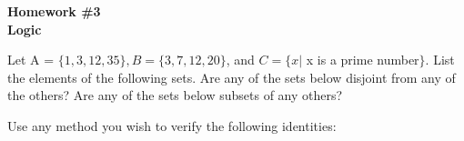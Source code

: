 \documentclass[addpoints,12pt]{exam}
\begin{document}
\begin{center}
    \textbf{\Large Homework \#3} \\
    \vspace{0.1in}
    \textbf{\large Logic}
\end{center}

\vspace{0.3in}

\begin{questions}
\question Let A = $\{1, 3, 12, 35\}, B = \{3, 7, 12, 20\}$, and $C = \{x |$ x is a prime
number$ \}$. List the elements of the following sets. Are any of the sets
below disjoint from any of the others? Are any of the sets below
subsets of any others?


\question Use any method you wish to verify the following identities:
\end{questions}
\end{document}
